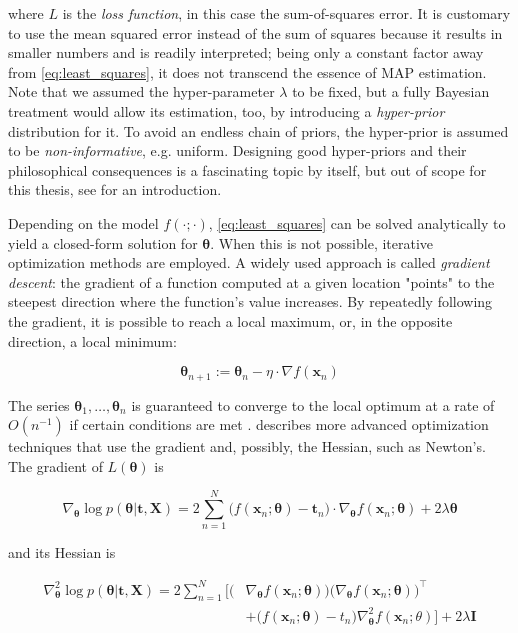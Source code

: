\documentclass[a4paper,11pt]{kth-mag}
\begin{document}
\noindent where $L$ is the \emph{loss function}, in this case the sum-of-squares error. It is customary to use the mean squared error instead of the sum of squares because it results in smaller numbers and is readily interpreted; being only a constant factor away from \ref{eq:least_squares}, it does not transcend the essence of MAP estimation. Note that we assumed the hyper-parameter $\lambda$ to be fixed, but a fully Bayesian treatment would allow its estimation, too, by introducing a \emph{hyper-prior} distribution for it. To avoid an endless chain of priors, the hyper-prior is assumed to be \emph{non-informative}, e.g. uniform. Designing good hyper-priors and their philosophical consequences is a fascinating topic by itself, but out of scope for this thesis, see \cite{hyperpr} for an introduction.
 
Depending on the model $f(\cdot;\cdot)$, \ref{eq:least_squares} can be solved analytically to yield a closed-form solution for $\bm\theta$. When this is not possible, iterative optimization methods are employed. A widely used approach is called \emph{gradient descent}: the gradient of a function computed at a given location "points" to the steepest direction where the function's value increases. By repeatedly following the gradient, it is possible to reach a local maximum, or, in the opposite direction, a local minimum:

\begin{equation}
\bm\theta_{n+1}:=\bm\theta_n-\eta\cdot\nabla f(\bm x_n)
\end{equation}

The series $\bm\theta_1,\ldots,\bm\theta_n$ is guaranteed to converge to the local optimum at a rate of $O(n^{-1})$ if certain conditions are met \citep{gd_convergence}. \cite{numopt} describes more advanced optimization techniques that use the gradient and, possibly, the Hessian, such as Newton's. The gradient of $L(\bm\theta)$ is

\begin{equation}
\label{eq:least_squares_gradient}
\nabla_{\bm\theta}\log p(\bm\theta\vert\bm t,\bm X)
=2\sum_{n=1}^N \big(f(\bm x_n;\bm\theta)-\bm t_n\big)\cdot\nabla_{\bm\theta}f(\bm x_n;\bm\theta) + 2\lambda\bm\theta
\end{equation}

\noindent and its Hessian is

\begin{equation}
\label{eq:least_squares_hessian}
\begin{split}
\nabla^2_{\bm\theta}\log p(\bm\theta\vert\bm t,\bm X)=2\sum_{n=1}^{N}\bigg[
\big( & \nabla_{\bm\theta} f(\bm x_n;\bm\theta)\big)
\big(\nabla_{\bm\theta} f(\bm x_n;\bm\theta)\big)^\intercal
\\
& +\big(f(\bm x_n;\bm\theta)-t_n\big)\nabla^2_{\bm\theta}f(\bm x_n;\theta)\bigg]+2\lambda\bm I
\end{split}
\end{equation}
\end{document}
